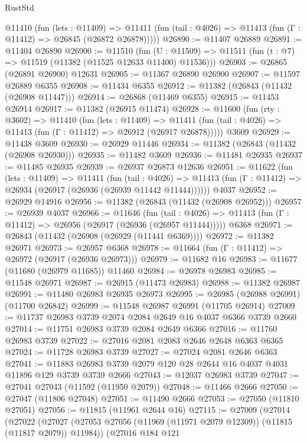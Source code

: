 \begin{lexlean}{RustStd}
\begin{coremodule}
    @11410
      (fun (lets : @11409) =>
      @11411 (fun (tail : @4026) => @11413 (fun (Γ : @11412) => @26845 (@26872 @26878)))))
@26890 := @11407 @26889
@26891 := @11404 @26890
@26900 := @11510
    (fun (U : @11509) => @11511 (fun (t : @7) => @11519 (@11382 (@11525 @12633 @11400) @11536)))
@26903 := @26865 (@26891 @26900) @12631
@26905 := @11367 @26890 @26900
@26907 := @11597 @26889 @6355
@26908 := @11434 @6355
@26912 := @11382 (@26843 (@11432 (@26908 @11447)))
@26914 := @26868 (@11469 @6355)
@26915 := @11453 @26914
@26917 := @11382 (@26915 @11474)
@26928 := @11600
    (fun (rty : @3602) =>
    @11410
      (fun (lets : @11409) =>
      @11411 (fun (tail : @4026) => @11413 (fun (Γ : @11412) => @26912 (@26917 @26878)))))
    @3609
@26929 := @11438 @3609
@26930 := @26929 @11446
@26934 := @11382 (@26843 (@11432 (@26908 @26930)))
@26935 := @11482 @3609
@26936 := @11481 @26935
@26937 := @11485 @26935
@26939 := @26937 @26873 @12636
@26951 := @11622
    (fun (lets : @11409) =>
    @11411
      (fun (tail : @4026) =>
      @11413 (fun (Γ : @11412) => @26934 (@26917 (@26936 (@26939 @11442 @11444))))))
    @4037
@26952 := @26929 @14916
@26956 := @11382 (@26843 (@11432 (@26908 @26952)))
@26957 := @26939 @4037
@26966 := @11646
    (fun (tail : @4026) => @11413 (fun (Γ : @11412) => @26956 (@26917 (@26936 (@26957 @11444)))))
    @6368
@26971 := @26843 (@11432 (@26908 (@26929 (@11441 @6369))))
@26972 := @11382 @26971
@26973 := @26957 @6368
@26978 := @11664 (fun (Γ : @11412) => @26972 (@26917 (@26936 @26973)))
@26979 := @11682 @16
@26983 := @11677 (@11680 (@26979 @11685)) @11460
@26984 := @26978 @26983
@26985 := @11548 @26971
@26987 := @26915 (@11473 @26983)
@26988 := @11382 @26987
@26991 := @11480 @26983 @26935 @26973
@26995 := @26985 (@26988 @26991) (@11700 @26842)
@26999 := @11548 @26987 @26991 (@11705 @26914)
@27009 := @11737 @26983 @3739 @2074 @2084 @2649 @16 @4037 @6366 @3739 @2660
@27014 := @11751 @26983 @3739 @2084 @2649 @6366
@27016 := @11760 @26983 @3739
@27022 := @27016 @2081 @2083 @2646 @2648 @6363 @6365
@27024 := @11728 @26983 @3739
@27027 := @27024 @2081 @2646 @6363
@27041 := @11883 @26983 @3739 @2079 @120 @28 @2644 @16 @4037 @4031 @11896 @129 @3739 @3739 @2666
@27043 := @12037 @26983 @3739
@27047 := @27041 @27043 (@11592 (@11950 @2079))
@27048 := @11466 @2666
@27050 := @27047 (@11806 @27048)
@27051 := @11490 @2666
@27053 := @27050 (@11810 @27051)
@27056 := @11815 (@11961 @2644 @16)
@27115 := @27009
    (@27014
      (@27022
        (@27027 (@27053 @27056 (@11969 (@11971 @2079 @12309)) (@11815 (@11817 @2079)) @11984))
        (@27016
          @184
          @121

\end{coremodule}
\end{lexlean}
